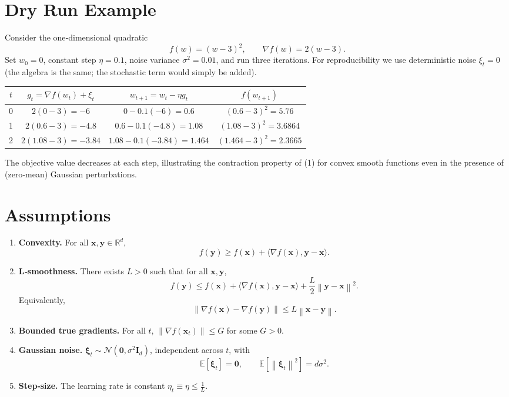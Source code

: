 \documentclass{article}
\newcommand{\E}{\mathbb{E}}
\newcommand{\R}{\mathbb{R}}
\newcommand{\norm}[1]{\left\|#1\right\|}
\newcommand{\inner}[2]{\langle #1,#2\rangle}
\newcommand{\grad}{\nabla}
\begin{document}
\section*{Dry Run Example}
Consider the one‑dimensional quadratic
\[
f(w)=(w-3)^2,\qquad \grad f(w)=2(w-3).
\]
Set $w_0=0$, constant step $\eta=0.1$, noise variance $\sigma^{2}=0.01$, and run three iterations.  
For reproducibility we use deterministic noise $\xi_t=0$ (the algebra is the same; the stochastic term would simply be added).

\begin{center}
\begin{tabular}{c|c|c|c}
$t$ & $g_t=\grad f(w_t)+\xi_t$ & $w_{t+1}=w_t-\eta g_t$ & $f(w_{t+1})$\\\hline
0 & $2(0-3)=-6$ & $0-0.1(-6)=0.6$ & $(0.6-3)^2=5.76$\\
1 & $2(0.6-3)=-4.8$ & $0.6-0.1(-4.8)=1.08$ & $(1.08-3)^2=3.6864$\\
2 & $2(1.08-3)=-3.84$ & $1.08-0.1(-3.84)=1.464$ & $(1.464-3)^2=2.3665$\\
\end{tabular}
\end{center}
The objective value decreases at each step, illustrating the contraction property of (1) for convex smooth functions even in the presence of (zero‑mean) Gaussian perturbations.

\newpage
\section*{Assumptions}
\begin{enumerate}[label={A\arabic*:}, leftmargin=*]
\item \textbf{Convexity.} For all $\bm{x},\bm{y}\in\R^{d}$,
\[
f(\bm{y})\ge f(\bm{x})+\inner{\grad f(\bm{x})}{\bm{y}-\bm{x}} .
\tag{A1}
\]
\item \textbf{L‑smoothness.} There exists $L>0$ such that for all $\bm{x},\bm{y}$,
\[
f(\bm{y})\le f(\bm{x})+\inner{\grad f(\bm{x})}{\bm{y}-\bm{x}}+\frac{L}{2}\norm{\bm{y}-\bm{x}}^{2}.
\tag{A2}
\]
Equivalently,
\[
\norm{\grad f(\bm{x})-\grad f(\bm{y})}\le L\norm{\bm{x}-\bm{y}} .
\tag{A2$'$}
\]
\item \textbf{Bounded true gradients.} For all $t$, $\norm{\grad f(\bm{x}_t)}\le G$ for some $G>0$.
\item \textbf{Gaussian noise.} $\bm{\xi}_t\sim\mathcal N(\mathbf0,\sigma^{2}\bm I_{d})$, independent across $t$, with
\[
\E[\bm{\xi}_t]=\mathbf0,\qquad \E[\norm{\bm{\xi}_t}^{2}]=d\sigma^{2}.
\tag{A4}
\]
\item \textbf{Step‑size.} The learning rate is constant $\eta_t\equiv\eta\le \frac{1}{L}$.
\end{enumerate}
\end{document}
